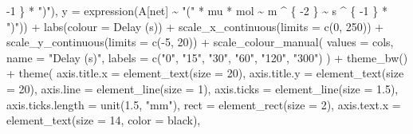 \documentclass[
]{krantz}
\makeatletter
\newenvironment{Shaded}{\begin{snugshade}}{\end{snugshade}}
\newcommand{\AttributeTok}[1]{\textcolor[rgb]{0.77,0.63,0.00}{#1}}
\newcommand{\DecValTok}[1]{\textcolor[rgb]{0.00,0.00,0.81}{#1}}
\newcommand{\FloatTok}[1]{\textcolor[rgb]{0.00,0.00,0.81}{#1}}
\newcommand{\FunctionTok}[1]{\textcolor[rgb]{0.00,0.00,0.00}{#1}}
\newcommand{\NormalTok}[1]{#1}
\newcommand{\SpecialCharTok}[1]{\textcolor[rgb]{0.00,0.00,0.00}{#1}}
\newcommand{\StringTok}[1]{\textcolor[rgb]{0.31,0.60,0.02}{#1}}
\newenvironment{kframe}{%
\medskip{}
\setlength{\fboxsep}{.8em}
 \def\at@end@of@kframe{}%
 \ifinner\ifhmode%
  \def\at@end@of@kframe{\end{minipage}}%
  \begin{minipage}{\columnwidth}%
 \fi\fi%
 \def\FrameCommand##1{\hskip\@totalleftmargin \hskip-\fboxsep
 \colorbox{shadecolor}{##1}\hskip-\fboxsep
     \hskip-\linewidth \hskip-\@totalleftmargin \hskip\columnwidth}%
 \MakeFramed {\advance\hsize-\width
   \@totalleftmargin\z@ \linewidth\hsize
   \@setminipage}}%
 {\par\unskip\endMakeFramed%
 \at@end@of@kframe}
\renewenvironment{Shaded}{\begin{kframe}}{\end{kframe}}
\makeatother
\begin{document}
\begin{Shaded}
\begin{Highlighting}[]
    \SpecialCharTok{{-}}\DecValTok{1}
\NormalTok{  \} }\SpecialCharTok{*} \StringTok{")"}\NormalTok{),}
  \AttributeTok{y =} \FunctionTok{expression}\NormalTok{(A[net] }\SpecialCharTok{\textasciitilde{}} \StringTok{"("} \SpecialCharTok{*}\NormalTok{ mu }\SpecialCharTok{*}\NormalTok{ mol }\SpecialCharTok{\textasciitilde{}}\NormalTok{ m }\SpecialCharTok{\^{}}\NormalTok{ \{}
    \SpecialCharTok{{-}}\DecValTok{2}
\NormalTok{  \} }\SpecialCharTok{\textasciitilde{}}\NormalTok{ s }\SpecialCharTok{\^{}}\NormalTok{ \{}
    \SpecialCharTok{{-}}\DecValTok{1}
\NormalTok{  \} }\SpecialCharTok{*} \StringTok{")"}\NormalTok{)) }\SpecialCharTok{+}
  \FunctionTok{labs}\NormalTok{(}\AttributeTok{colour =} \StringTok{\textquotesingle{}Delay (s)\textquotesingle{}}\NormalTok{) }\SpecialCharTok{+}
  \FunctionTok{scale\_x\_continuous}\NormalTok{(}\AttributeTok{limits =} \FunctionTok{c}\NormalTok{(}\DecValTok{0}\NormalTok{, }\DecValTok{250}\NormalTok{)) }\SpecialCharTok{+}
  \FunctionTok{scale\_y\_continuous}\NormalTok{(}\AttributeTok{limits =} \FunctionTok{c}\NormalTok{(}\SpecialCharTok{{-}}\DecValTok{5}\NormalTok{, }\DecValTok{20}\NormalTok{)) }\SpecialCharTok{+}
  \FunctionTok{scale\_colour\_manual}\NormalTok{(}
    \AttributeTok{values =}\NormalTok{ cols,}
    \AttributeTok{name =} \StringTok{"Delay (s)"}\NormalTok{,}
    \AttributeTok{labels =} \FunctionTok{c}\NormalTok{(}\StringTok{"0"}\NormalTok{, }\StringTok{"15"}\NormalTok{, }\StringTok{"30"}\NormalTok{, }\StringTok{"60"}\NormalTok{, }\StringTok{"120"}\NormalTok{, }\StringTok{"300"}\NormalTok{)}
\NormalTok{  ) }\SpecialCharTok{+}
  \FunctionTok{theme\_bw}\NormalTok{() }\SpecialCharTok{+}
  \FunctionTok{theme}\NormalTok{(}
    \AttributeTok{axis.title.x =} \FunctionTok{element\_text}\NormalTok{(}\AttributeTok{size =} \DecValTok{20}\NormalTok{),}
    \AttributeTok{axis.title.y =} \FunctionTok{element\_text}\NormalTok{(}\AttributeTok{size =} \DecValTok{20}\NormalTok{),}
    \AttributeTok{axis.line =} \FunctionTok{element\_line}\NormalTok{(}\AttributeTok{size =} \DecValTok{1}\NormalTok{),}
    \AttributeTok{axis.ticks =} \FunctionTok{element\_line}\NormalTok{(}\AttributeTok{size =} \FloatTok{1.5}\NormalTok{),}
    \AttributeTok{axis.ticks.length =} \FunctionTok{unit}\NormalTok{(}\FloatTok{1.5}\NormalTok{, }\StringTok{"mm"}\NormalTok{),}
    \AttributeTok{rect =} \FunctionTok{element\_rect}\NormalTok{(}\AttributeTok{size =} \DecValTok{2}\NormalTok{),}
    \AttributeTok{axis.text.x =} \FunctionTok{element\_text}\NormalTok{(}\AttributeTok{size =} \DecValTok{14}\NormalTok{, }\AttributeTok{color =} \StringTok{\textquotesingle{}black\textquotesingle{}}\NormalTok{),}

\end{Highlighting}
\end{Shaded}
\end{document}
